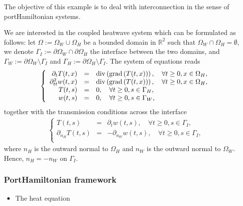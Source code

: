 \documentclass[letterpaper,10pt,english]{sphinxmanual}
\begin{document}
\sphinxAtStartPar
The objective of this example is to deal with interconnection in the
sense of port\sphinxhyphen{}Hamiltonian systems.

\sphinxAtStartPar
We are interested in the coupled heat\sphinxhyphen{}wave system which can be
formulated as follows: let \(\Omega := \Omega_W \cup \Omega_H\) be a
bounded domain in \(\mathbb{R}^2\) such that
\(\Omega_W \cap \Omega_H = \emptyset\), we denote
\(\Gamma_I := \partial\Omega_W \cap \partial\Omega_H\) the interface
between the two domains, and
\(\Gamma_W := \partial\Omega_W \setminus \Gamma_I\) and
\(\Gamma_H := \partial\Omega_H \setminus \Gamma_I\). The system of
equations reads
\begin{equation*}
\begin{split}\left\lbrace
\begin{array}{rcl}
\partial_t T(t,x) &=& {\rm div}\left( {\rm grad}\left( T(t,x) \right)\right), \quad \forall t\ge0, x \in \Omega_H, \\
\partial_{tt}^2 w(t,x) &=& {\rm div}\left( {\rm grad}\left( T(t,x) \right)\right), \quad \forall t\ge0, x \in \Omega_H, \\
T(t,s) &=& 0, \quad \forall t\ge0, s \in \Gamma_H, \\
w(t,s) &=& 0, \quad \forall t\ge0, s \in \Gamma_W, \\
\end{array}
\right.\end{split}
\end{equation*}
\sphinxAtStartPar
together with the transmission conditions across the interface
\begin{equation*}
\begin{split}\left\lbrace
\begin{array}{rcl}
T(t,s) &=& \partial_t w(t,s), \quad \forall t\ge0, s \in \Gamma_I, \\
\partial_{n_H} T(t,s) &=& - \partial_{n_W} w(t,s), \quad \forall t\ge0, s \in \Gamma_I, \\
\end{array}
\right.\end{split}
\end{equation*}
\sphinxAtStartPar
where \(n_H\) is the outward normal to \(\Omega_H\) and
\(n_W\) is the outward normal to \(\Omega_W\). Hence,
\(n_H = -n_W\) on \(\Gamma_I\).


\subsubsection{Port\sphinxhyphen{}Hamiltonian framework}
\label{\detokenize{examples/heat_wave:port-hamiltonian-framework}}\begin{itemize}
\item {} 
\sphinxAtStartPar
The heat equation

\end{itemize}
\end{document}
